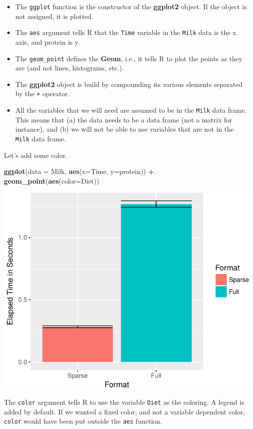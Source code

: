 \documentclass[]{book}
\newenvironment{Shaded}{\begin{snugshade}}{\end{snugshade}}
\newcommand{\DataTypeTok}[1]{\textcolor[rgb]{0.13,0.29,0.53}{#1}}
\newcommand{\KeywordTok}[1]{\textcolor[rgb]{0.13,0.29,0.53}{\textbf{#1}}}
\newcommand{\NormalTok}[1]{#1}
\newcommand{\OperatorTok}[1]{\textcolor[rgb]{0.81,0.36,0.00}{\textbf{#1}}}
\newcommand{\StringTok}[1]{\textcolor[rgb]{0.31,0.60,0.02}{#1}}
\providecommand{\tightlist}{%
  \setlength{\itemsep}{0pt}\setlength{\parskip}{0pt}}
\theoremstyle{definition}
\theoremstyle{definition}
\theoremstyle{definition}
\theoremstyle{remark}
\begin{document}
\begin{itemize}
\tightlist
\item
  The \texttt{ggplot} function is the constructor of the \textbf{ggplot2} object. If the object is not assigned, it is plotted.
\item
  The \texttt{aes} argument tells R that the \texttt{Time} variable in the \texttt{Milk} data is the x axis, and protein is y.
\item
  The \texttt{geom\_point} defines the \textbf{Geom}, i.e., it tells R to plot the points as they are (and not lines, histograms, etc.).
\item
  The \textbf{ggplot2} object is build by compounding its various elements separated by the \texttt{+} operator.
\item
  All the variables that we will need are assumed to be in the \texttt{Milk} data frame. This means that (a) the data needs to be a data frame (not a matrix for instance), and (b) we will not be able to use variables that are not in the \texttt{Milk} data frame.
\end{itemize}

Let's add some color.

\begin{Shaded}
\begin{Highlighting}[]
\KeywordTok{ggplot}\NormalTok{(}\DataTypeTok{data =}\NormalTok{ Milk, }\KeywordTok{aes}\NormalTok{(}\DataTypeTok{x=}\NormalTok{Time, }\DataTypeTok{y=}\NormalTok{protein)) }\OperatorTok{+}
\StringTok{  }\KeywordTok{geom_point}\NormalTok{(}\KeywordTok{aes}\NormalTok{(}\DataTypeTok{color=}\NormalTok{Diet))}
\end{Highlighting}
\end{Shaded}

\includegraphics[width=0.5\linewidth]{Rcourse_files/figure-latex/unnamed-chunk-275-1}

The \texttt{color} argument tells R to use the variable \texttt{Diet} as the coloring.
A legend is added by default.
If we wanted a fixed color, and not a variable dependent color, \texttt{color} would have been put outside the \texttt{aes} function.
\end{document}
